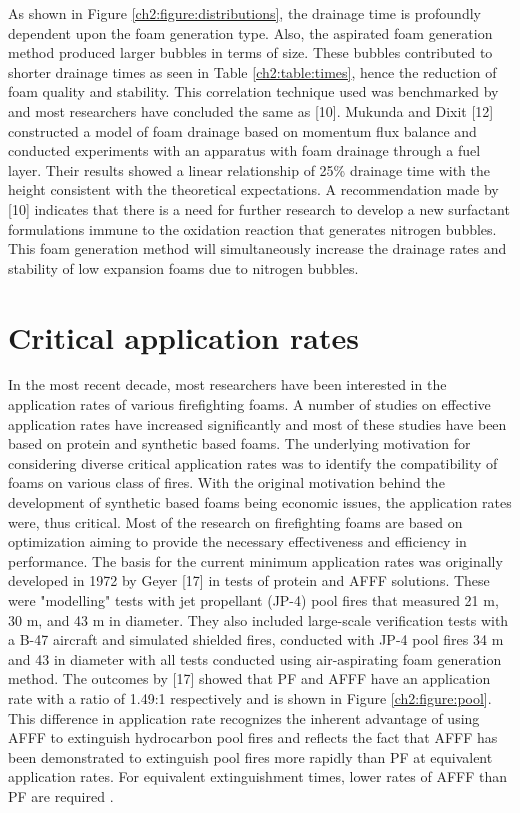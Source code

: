 \documentclass[12pt]{report}
\begin{document}
As shown in Figure \ref{ch2:figure:distributions}, the drainage time is profoundly dependent upon the foam generation type. Also, the aspirated foam generation method produced larger bubbles in terms of size. These bubbles contributed to shorter drainage times as seen in Table \ref{ch2:table:times}, hence the reduction of foam quality and stability. This correlation technique used was benchmarked by \cite{oguike2013study} and most researchers have concluded the same as [10]. Mukunda and Dixit [12] constructed a model of foam drainage based on momentum flux balance and conducted experiments with an apparatus with foam drainage through a fuel layer. Their results showed a linear relationship of 25\% drainage time with the height consistent with the theoretical expectations. A recommendation made by [10] indicates that there is a need for further research to develop a new surfactant formulations immune to the oxidation reaction that generates nitrogen bubbles. This foam generation method will simultaneously increase the drainage rates and stability of low expansion foams due to nitrogen bubbles.

\section{Critical application rates}
In the most recent decade, most researchers have been interested in the application rates of various firefighting foams. A number of studies on effective application rates have increased significantly and most of these studies have been based on protein and synthetic based foams. The underlying motivation for considering diverse critical application rates was to identify the compatibility of foams on various class of fires. With the original motivation behind the development of synthetic based foams being economic issues, the application rates were, thus critical.
Most of the research on firefighting foams are based on optimization aiming to provide the necessary effectiveness and efficiency in performance. The basis for the current minimum application rates was originally developed in 1972 by Geyer [17] in tests of protein and AFFF solutions. These were "modelling" tests with jet propellant (JP-4) pool fires that measured 21 m, 30 m, and 43 m in diameter. They also included large-scale verification tests with a B-47 aircraft and simulated shielded fires, conducted with JP-4 pool fires 34 m and 43 in diameter with all tests conducted using air-aspirating foam generation method. The outcomes by [17] showed that PF and AFFF have an application rate with a ratio of 1.49:1 respectively and is shown in Figure \ref{ch2:figure:pool}. This difference in application rate recognizes the inherent advantage of using AFFF to extinguish hydrocarbon pool fires and reflects the fact that AFFF has been demonstrated to extinguish pool fires more rapidly than PF at equivalent application rates. For equivalent extinguishment times, lower rates of AFFF than PF are required \cite{scheffey1995evaluating}.
\end{document}
